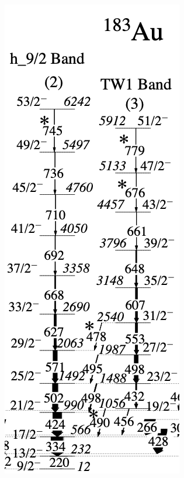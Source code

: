 \documentclass[12pt, a4paper]{article}
\begin{document}
\begin{figure}[ht]
    \centering
    \includegraphics[scale=0.3]{figs/negative_Au183.png}\hspace{2cm}

\end{figure}
\end{document}
